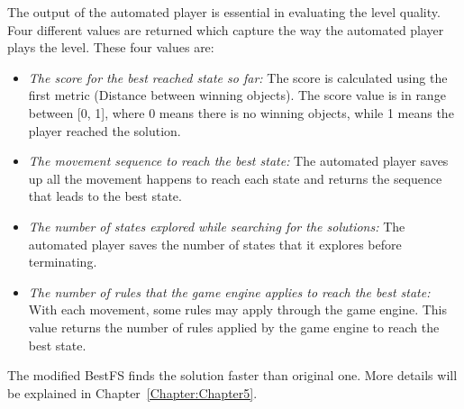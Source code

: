 \documentclass[letterpaper]{article}
\newcommand{\chref}[1]{Chapter~\ref{Chapter:#1}}
\begin{document}
The output of the automated player is essential in evaluating the level quality. Four different values are returned which capture the way the automated player plays the level. These four values are:
\begin{itemize}
	\item \emph{The score for the best reached state so far:} The score is calculated using the first metric (Distance between winning objects). The score value is in range between [0, 1], where 0 means there is no winning objects, while 1 means the player reached the solution.
	\item \emph{The movement sequence to reach the best state:} The automated player saves up all the movement happens to reach each state and returns the sequence that leads to the best state.
	\item \emph{The number of states explored while searching for the solutions:} The automated player saves the number of states that it explores before terminating.
	\item \emph{The number of rules that the game engine applies to reach the best state:} With each movement, some rules may apply through the game engine. This value returns the number of rules applied by the game engine to reach the best state.
\end{itemize}
The modified BestFS finds the solution faster than original one. More details will be explained in \chref{Chapter5}.\\\par
\end{document}
